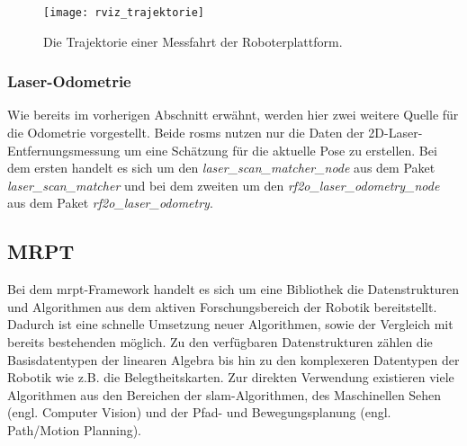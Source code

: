 \begin{figure}
	\centering
	\texttt{[image: rviz\_trajektorie]}
	\caption{Die Trajektorie einer Messfahrt der Roboterplattform.}
	\label{fig:rviz_trajektorie}
\end{figure}


%
%
\subsubsection{Laser-Odometrie}

Wie bereits im vorherigen Abschnitt erwähnt, werden hier zwei weitere Quelle für die Odometrie vorgestellt. Beide \Glspl{rosm} nutzen nur die Daten der 2D-Laser-Entfernungsmessung um eine Schätzung für die aktuelle Pose zu erstellen. Bei dem ersten handelt es sich um den \textit{laser\_scan\_matcher\_node} aus dem Paket \textit{laser\_scan\_matcher} und bei dem zweiten um den \textit{rf2o\_laser\_odometry\_node} aus dem Paket \textit{rf2o\_laser\_odometry}.


%
%
\subsection{MRPT}

Bei dem \Gls{mrpt}-Framework handelt es sich um eine Bibliothek die Datenstrukturen und Algorithmen aus dem aktiven Forschungsbereich der Robotik bereitstellt. Dadurch ist eine schnelle Umsetzung neuer Algorithmen, sowie der Vergleich mit bereits bestehenden möglich. Zu den verfügbaren Datenstrukturen zählen die Basisdatentypen der linearen Algebra bis hin zu den komplexeren Datentypen der Robotik wie z.B. die Belegtheitskarten. Zur direkten Verwendung existieren viele Algorithmen aus den Bereichen der \Gls{slam}-Algorithmen, des Maschinellen Sehen (engl. Computer Vision) und der Pfad- und Bewegungsplanung (engl. Path/Motion Planning).

